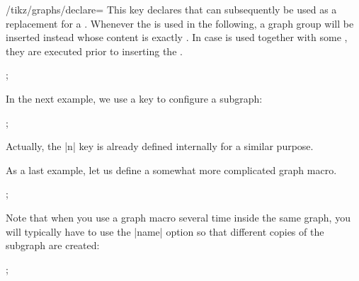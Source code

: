 \begin{key}{/tikz/graphs/declare=}
    This key declares that  can subsequently be used as a
    replacement for a . Whenever the  is used
    in the following, a graph group will be inserted instead whose content is
    exactly . In case  is used together
    with some , they are executed prior to inserting the
    .
\begin{codeexample}[preamble={\usetikzlibrary{graphs}}]
\tikz {};
\end{codeexample}
    In the next example, we use a key to configure a subgraph:
\begin{codeexample}[preamble={\usetikzlibrary{graphs}}]
\tikz {};
\end{codeexample}
    Actually, the |n| key is already defined internally for a similar purpose.

    As a last example, let us define a somewhat more complicated graph macro.
\begin{codeexample}[preamble={\usetikzlibrary{graphs}}]
\newcount\mycount
{}
\tikz {};
\end{codeexample}
\end{key}

Note that when you use a graph macro several time inside the same graph, you
will typically have to use the |name| option so that different copies of the
subgraph are created:
%
\begin{codeexample}[preamble={\usetikzlibrary{graphs}}]
\tikz {};
\end{codeexample}

